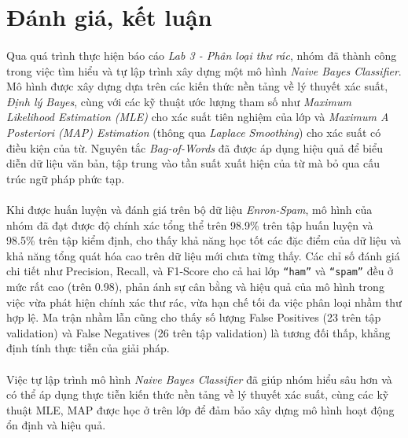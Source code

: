 \section{Đánh giá, kết luận}

\paragraph{}{Qua quá trình thực hiện báo cáo \textit{Lab 3 - Phân loại thư rác}, nhóm đã thành công trong việc tìm hiểu và tự lập trình xây dựng một mô hình \textit{Naive Bayes Classifier}. Mô hình được xây dựng dựa trên các kiến thức nền tảng về lý thuyết xác suất, \textit{Định lý Bayes}, cùng với các kỹ thuật ước lượng tham số như \textit{Maximum Likelihood Estimation (MLE)} cho xác suất tiên nghiệm của lớp và \textit{Maximum A Posteriori (MAP) Estimation} (thông qua \textit{Laplace Smoothing}) cho xác suất có điều kiện của từ. Nguyên tắc \textit{Bag-of-Words} đã được áp dụng hiệu quả để biểu diễn dữ liệu văn bản, tập trung vào tần suất xuất hiện của từ mà bỏ qua cấu trúc ngữ pháp phức tạp.}

\paragraph{}{Khi được huấn luyện và đánh giá trên bộ dữ liệu \textit{Enron-Spam}, mô hình của nhóm đã đạt được độ chính xác tổng thể trên 98.9\% trên tập huấn luyện và 98.5\% trên tập kiểm định, cho thấy khả năng học tốt các đặc điểm của dữ liệu và khả năng tổng quát hóa cao trên dữ liệu mới chưa từng thấy. Các chỉ số đánh giá chi tiết như Precision, Recall, và F1-Score cho cả hai lớp \texttt{``ham''} và \texttt{``spam''} đều ở mức rất cao (trên 0.98), phản ánh sự cân bằng và hiệu quả của mô hình trong việc vừa phát hiện chính xác thư rác, vừa hạn chế tối đa việc phân loại nhầm thư hợp lệ. Ma trận nhầm lẫn cũng cho thấy số lượng False Positives (23 trên tập validation) và False Negatives (26 trên tập validation) là tương đối thấp, khẳng định tính thực tiễn của giải pháp.}

\paragraph{}{Việc tự lập trình mô hình \textit{Naive Bayes Classifier} đã giúp nhóm hiểu sâu hơn và có thể áp dụng thực tiễn kiến thức nền tảng về lý thuyết xác suất, cùng các kỹ thuật MLE, MAP được học ở trên lớp để đảm bảo xây dựng mô hình hoạt động ổn định và hiệu quả.}